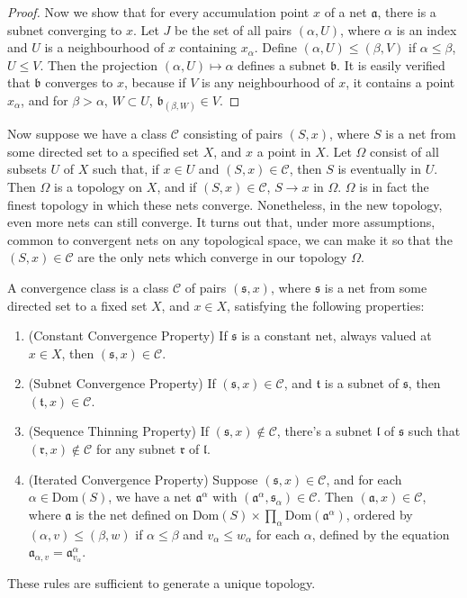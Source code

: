 \begin{example}
\begin{proof}
    Now we show that for every accumulation point $x$ of a net $\mathfrak{a}$, there is a subnet converging to $x$. Let $J$ be the set of all pairs $(\alpha, U)$, where $\alpha$ is an index and $U$ is a neighbourhood of $x$ containing $x_\alpha$. Define $(\alpha, U) \leq (\beta, V)$ if $\alpha \leq \beta$, $U \leq V$. Then the projection $(\alpha, U) \mapsto \alpha$ defines a subnet $\mathfrak{b}$. It is easily verified that $\mathfrak{b}$ converges to $x$, because if $V$ is any neighbourhood of $x$, it contains a point $x_\alpha$, and for $\beta > \alpha$, $W \subset U$, $\mathfrak{b}_{(\beta, W)} \in V$.
\end{proof}

Now suppose we have a class $\mathcal{C}$ consisting of pairs $(S,x)$, where $S$ is a net from some directed set to a specified set $X$, and $x$ a point in $X$. Let $\Omega$ consist of all subsets $U$ of $X$ such that, if $x \in U$ and $(S,x) \in \mathcal{C}$, then $S$ is eventually in $U$. Then $\Omega$ is a topology on $X$, and if $(S,x) \in \mathcal{C}$, $S \to x$ in $\Omega$. $\Omega$ is in fact the finest topology in which these nets converge. Nonetheless, in the new topology, even more nets can still converge. It turns out that, under more assumptions, common to convergent nets on any topological space, we can make it so that the $(S,x) \in \mathcal{C}$ are the only nets which converge in our topology $\Omega$.

A convergence class is a class $\mathcal{C}$ of pairs $(\mathfrak{s},x)$, where $\mathfrak{s}$ is a net from some directed set to a fixed set $X$, and $x \in X$, satisfying the following properties:
%
\begin{enumerate}
    \item (Constant Convergence Property) If $\mathfrak{s}$ is a constant net, always valued at $x \in X$, then $(\mathfrak{s},x) \in \mathcal{C}$.
    \item (Subnet Convergence Property) If $(\mathfrak{s},x) \in \mathcal{C}$, and $\mathfrak{t}$ is a subnet of $\mathfrak{s}$, then $(\mathfrak{t},x) \in \mathcal{C}$.
    \item (Sequence Thinning Property) If $(\mathfrak{s},x) \not \in \mathcal{C}$, there's a subnet $\mathfrak{l}$ of $\mathfrak{s}$ such that $(\mathfrak{r},x) \not \in \mathcal{C}$ for any subnet $\mathfrak{r}$ of $\mathfrak{l}$.
    \item (Iterated Convergence Property) Suppose $(\mathfrak{s},x) \in \mathcal{C}$, and for each $\alpha \in \text{Dom}(S)$, we have a net $\mathfrak{a}^\alpha$ with $(\mathfrak{a}^\alpha, \mathfrak{s}_\alpha) \in \mathcal{C}$. Then $(\mathfrak{a},x) \in \mathcal{C}$, where $\mathfrak{a}$ is the net defined on $\text{Dom}(S) \times \prod_{\alpha} \text{Dom}(\mathfrak{a}^\alpha)$, ordered by $(\alpha, v) \leq (\beta, w)$ if $\alpha \leq \beta$ and $v_\alpha \leq w_\alpha$ for each $\alpha$, defined by the equation $\mathfrak{a}_{\alpha, v} = \mathfrak{a}^\alpha_{v_\alpha}$.
\end{enumerate}
%
These rules are sufficient to generate a unique topology.


\end{example}
